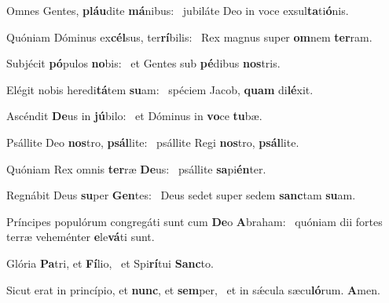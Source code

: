 \item Omnes Gentes, \textbf{pláu}dite \textbf{má}nibus:~\psstar{} jubiláte Deo in voce exsul\textbf{ta}ti\textbf{ó}nis.
\item Quóniam Dóminus ex\textbf{cél}sus, ter\textbf{rí}bilis:~\psstar{} Rex magnus super \textbf{om}nem \textbf{ter}ram.
\item Subjécit \textbf{pó}pulos \textbf{no}bis:~\psstar{} et Gentes sub \textbf{pé}dibus \textbf{nos}tris.
\item Elégit nobis heredi\textbf{tá}tem \textbf{su}am:~\psstar{} spéciem Jacob, \textbf{quam} di\textbf{lé}xit.
\item Ascéndit \textbf{De}us in \textbf{jú}bilo:~\psstar{} et Dóminus in \textbf{vo}ce \textbf{tu}bæ.
\item Psállite Deo \textbf{nos}tro, \textbf{psál}lite:~\psstar{} psállite Regi \textbf{nos}tro, \textbf{psál}lite.
\item Quóniam Rex omnis \textbf{ter}ræ \textbf{De}us:~\psstar{} psállite \textbf{sa}pi\textbf{én}ter.
\item Regnábit Deus \textbf{su}per \textbf{Gen}tes:~\psstar{} Deus sedet super sedem \textbf{sanc}tam \textbf{su}am.
\item Príncipes populórum congre\-gáti sunt cum \textbf{De}o \textbf{A}braham:~\psstar{} quóniam dii fortes terræ veheménter \textbf{e}le\textbf{vá}ti sunt.
\item Glória \textbf{Pa}tri, et \textbf{Fí}lio,~\psstar{} et Spi\textbf{rí}tui \textbf{Sanc}to.
\item Sicut erat in princípio, et \textbf{nunc}, et \textbf{sem}per,~\psstar{} et in sǽcula sæcu\textbf{ló}rum. \textbf{A}men.
